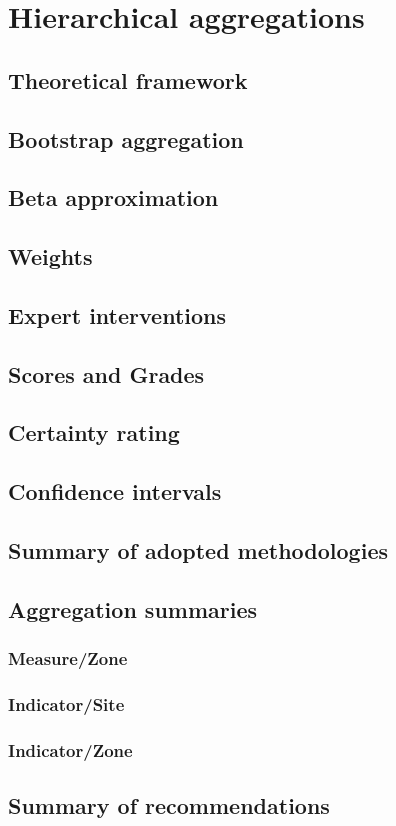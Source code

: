 \documentclass[a4paper]{AIMSreport}
\begin{document}
\section{Hierarchical aggregations}
\subsection{Theoretical framework}
\subsection{Bootstrap aggregation}                   
\subsection{Beta approximation}
\subsection{Weights}           
\subsection{Expert interventions}
\subsection{Scores and Grades}
\subsection{Certainty rating}
\subsection{Confidence intervals}

\subsection{Summary of adopted methodologies}
\subsection{Aggregation summaries}
\subsubsection{Measure/Zone}
\subsubsection{Indicator/Site}
\subsubsection{Indicator/Zone}

\subsection{Summary of recommendations}
 
~\\[2em]



\clearpage
\end{document}
